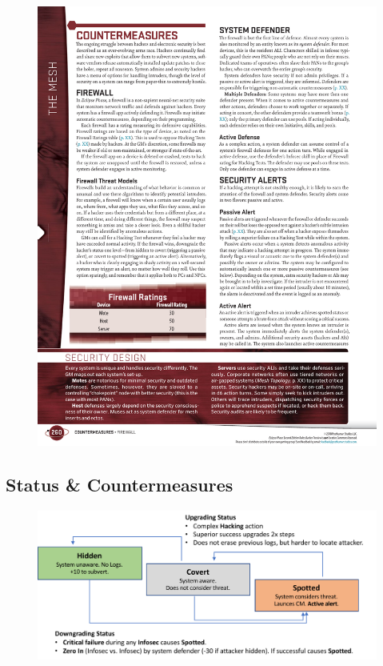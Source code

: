 \begin{figure}[htbp!]%
   \centering
   \includegraphics[scale=1.0]{gfx/mesh-firewall}%
\end{figure}%

\subsection*{Status \& Countermeasures}

\begin{figure}[H]%
   \centering
   \includegraphics[scale=0.65]{gfx/mesh-hacking-visibility}%
\end{figure}%

